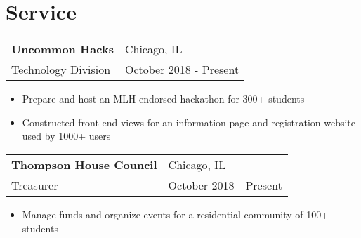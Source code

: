 \documentclass[letterpaper, 12pt]{article}
\begin{document}
\section{Service}
\vspace{10pt}
{
  \begin{tabular}{@{} L{12cm} @{} R{4.51cm} @{}}
    \textbf{Uncommon Hacks} & Chicago, IL \\
    Technology Division & October 2018 - Present \\
  \end{tabular}
}
\vspace{-10pt}
\begin{itemize}
  \item Prepare and host an MLH endorsed hackathon for 300+ students
  \item Constructed front-end views for an information page and registration website used by 1000+ users
\end{itemize}

\vspace{10pt}
{
  \begin{tabular}{@{} L{12cm} @{} R{4.51cm} @{}}
    \textbf{Thompson House Council} & Chicago, IL \\
    Treasurer & October 2018 - Present \\
  \end{tabular}
}
\vspace{-10pt}
\begin{itemize}
  \item Manage funds and organize events for a residential community of 100+ students 
\end{itemize}
\end{document}
